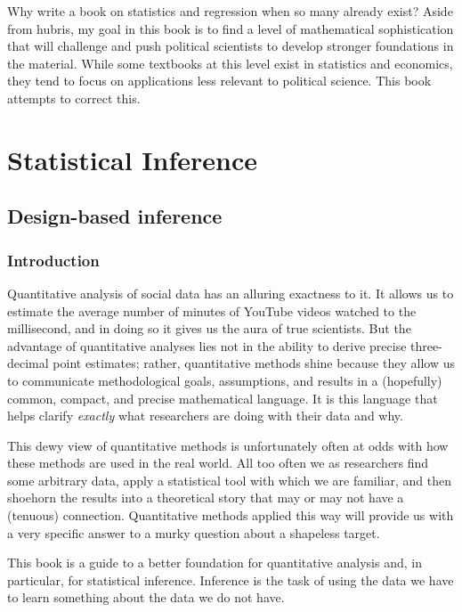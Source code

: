 \documentclass[
  letterpaper,
  DIV=11,
  numbers=noendperiod]{scrreprt}
\theoremstyle{definition}
\theoremstyle{definition}
\theoremstyle{plain}
\theoremstyle{remark}
\begin{document}
Why write a book on statistics and regression when so many already
exist? Aside from hubris, my goal in this book is to find a level of
mathematical sophistication that will challenge and push political
scientists to develop stronger foundations in the material. While some
textbooks at this level exist in statistics and economics, they tend to
focus on applications less relevant to political science. This book
attempts to correct this.

\part{Statistical Inference}

\hypertarget{design-based-inference}{%
\chapter{Design-based inference}\label{design-based-inference}}

\hypertarget{introduction-1}{%
\section{Introduction}\label{introduction-1}}

Quantitative analysis of social data has an alluring exactness to it. It
allows us to estimate the average number of minutes of YouTube videos
watched to the millisecond, and in doing so it gives us the aura of true
scientists. But the advantage of quantitative analyses lies not in the
ability to derive precise three-decimal point estimates; rather,
quantitative methods shine because they allow us to communicate
methodological goals, assumptions, and results in a (hopefully) common,
compact, and precise mathematical language. It is this language that
helps clarify \emph{exactly} what researchers are doing with their data
and why.

This dewy view of quantitative methods is unfortunately often at odds
with how these methods are used in the real world. All too often we as
researchers find some arbitrary data, apply a statistical tool with
which we are familiar, and then shoehorn the results into a theoretical
story that may or may not have a (tenuous) connection. Quantitative
methods applied this way will provide us with a very specific answer to
a murky question about a shapeless target.

This book is a guide to a better foundation for quantitative analysis
and, in particular, for statistical inference. Inference is the task of
using the data we have to learn something about the data we do not have.
\end{document}
